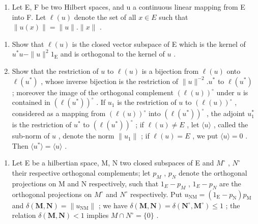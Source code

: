 \begin{enumerate}
\begin{enumerate}
\def\labelenumi{\arabic{enumi})}
\setcounter{enumi}{4}
\tightlist
\item
  Let E, F be two Hilbert spaces, and u a continuous linear mapping from E into F. Let \(\ell(u)\) denote the set of all \(x \in E\) such that \(\|u(x)\| = \|u\|. \|x\|\) .
\end{enumerate}

\begin{enumerate}
\def\labelenumi{\alph{enumi})}
\item
  Show that \(\ell(u)\) is the closed vector subspace of E which is the kernel of \(u^{*}u - \| u\|^{2}1_{\mathrm{E}}\) and is orthogonal to the kernel of \(u\) .
\item
  Show that the restriction of \(u\) to \(\ell(u)\) is a bijection from \(\ell(u)\) onto \(\ell(u^*)\) , whose inverse bijection is the restriction of \(\|u\|^{-2}.u^*\) to \(\ell(u^*)\) ; moreover the image of the orthogonal complement \((\ell(u))^{\circ}\) under \(u\) is contained in \((\ell(u^*))^{\circ}\) . If \(u_1\) is the restriction of \(u\) to \((\ell(u))^{\circ}\) , considered as a mapping from \((\ell(u))^{\circ}\) into \((\ell(u^*))^{\circ}\) , the adjoint \(u_1^*\) is the restriction of \(u^*\) to \((\ell(u^*))^{\circ}\) ; if \(\ell(u) \neq E\) , let \(\langle u\rangle\) , called the sub-norm of \(u\) , denote the norm \(\|u_1\|\) ; if \(\ell(u) = E\) , we put \(\langle u\rangle = 0\) . Then \(\langle u^*\rangle = \langle u\rangle\) .
\end{enumerate}

\begin{enumerate}
\def\labelenumi{\arabic{enumi})}
\setcounter{enumi}{5}
\tightlist
\item
  Let E be a hilbertian space, M, N two closed subspaces of E and \(M^{\circ}\) , \(N^{\circ}\) their respective orthogonal complements; let \(p_{M}\) , \(p_{N}\) denote the orthogonal projections on M and N respectively, such that \(1_{E} - p_{M}\) , \(1_{E} - p_{N}\) are the orthogonal projections on \(M^{\circ}\) and \(N^{\circ}\) respectively. Put \(u_{\mathrm{NM}} = (1_{\mathrm{E}} - p_{\mathrm{N}}) p_{\mathrm{M}}\) and \(\delta(\mathbf{M}, \mathbf{N}) = \|u_{\mathrm{NM}}\|\) ; we have \(\delta(\mathbf{M}, \mathbf{N}) = \delta(\mathbf{N}^{\circ}, \mathbf{M}^{\circ}) \leqslant 1\) ; the relation \(\delta(\mathbf{M}, \mathbf{N}) < 1\) implies \(M \cap N^{\circ} = \{0\}\) .
\end{enumerate}


\end{enumerate}
